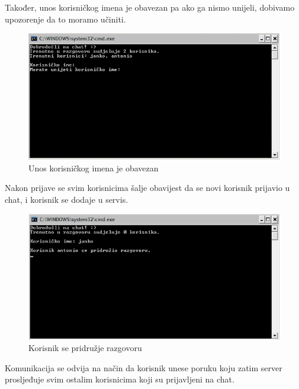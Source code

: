\documentclass[10pt,a4paper,onecolumn,titlepage]{article}
\begin{document}
Također, unos korisničkog imena je obavezan pa ako ga nismo unijeli, dobivamo upozorenje da to moramo učiniti.

\begin{figure}[!ht]
\begin{minipage}{\textwidth}
\centering
\includegraphics[width=\textwidth]{images/username_required.jpg}
\caption{Unos korisničkog imena je obavezan}
\end{minipage}
\end{figure}

Nakon prijave se svim korisnicima šalje obavijest da se novi korisnik prijavio
u chat, i korisnik se dodaje u servis.

\newpage

\begin{figure}[!ht]
\begin{minipage}{\textwidth}
\centering
\includegraphics[width=\textwidth]{images/joining_notification.jpg}
\caption{Korisnik se pridružje razgovoru}
\end{minipage}
\end{figure}

Komunikacija se odvija na način da korisnik unese poruku koju zatim server prosljeđuje svim ostalim korisnicima koji su prijavljeni na chat.
\end{document}
